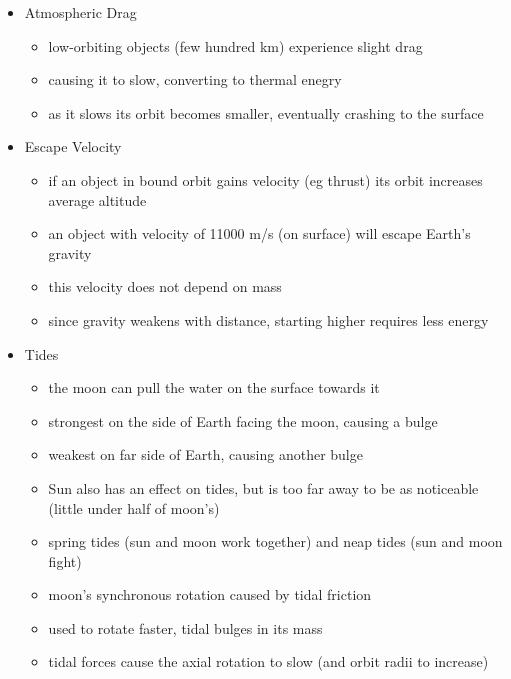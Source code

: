 \documentclass[12pt]{article}
\begin{document}
\begin{itemize}
\item Atmospheric Drag
\begin{itemize}
\item low-orbiting objects (few hundred km) experience slight drag
\item causing it to slow, converting to thermal enegry
\item as it slows its orbit becomes smaller, eventually crashing to the surface
\end{itemize}
\item Escape Velocity
\begin{itemize}
\item if an object in bound orbit gains velocity (eg thrust) its orbit increases average altitude
\item an object with velocity of 11000 m/s (on surface) will escape Earth's gravity
\item this velocity does not depend on mass
\item since gravity weakens with distance, starting higher requires less energy
\end{itemize}
\item Tides
\begin{itemize}
\item the moon can pull the water on the surface towards it
\item strongest on the side of Earth facing the moon, causing a bulge
\item weakest on far side of Earth, causing another bulge
\item Sun also has an effect on tides, but is too far away to be as noticeable (little under half of moon's)
\item spring tides (sun and moon work together) and neap tides (sun and moon fight)
\item moon's synchronous rotation caused by tidal friction
\item used to rotate faster, tidal bulges in its mass
\item tidal forces cause the axial rotation to slow (and orbit radii to increase)
\end{itemize}
\end{itemize}
\end{document}
